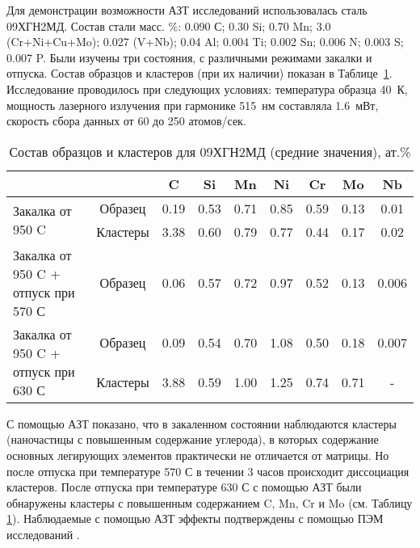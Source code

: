 Для демонстрации возможности АЗТ исследований использовалась сталь 09ХГН2МД. Состав стали масс. \%: 0.090 С; 0.30 Si; 0.70 Mn; 3.0 (Cr+Ni+Cu+Mo); 0.027 (V+Nb); 0.04 Al; 0.004 Ti; 0.002 Sn; 0.006 N; 0.003 S; 0.007 P. Были изучены три состояния, с различными режимами закалки и отпуска. Состав образцов и кластеров (при их наличии) показан в Таблице~\cref{tab:SteelComposition09X}. Исследование проводилось при следующих условиях: температура образца 40~К, мощность лазерного излучения при гармонике 515~нм составляла 1.6~мВт, скорость сбора данных от 60 до 250 атомов/сек.


\begin{table} [htbp]
	\centering
	\caption{Состав образцов и кластеров для 09ХГН2МД (средние значения), ат.\%}
	\label{tab:SteelComposition09X}%
	\begin{SingleSpace}
		\begin{tabular}{| p{4.5cm} | c | c | c | c | c | c | c | c |}
			\hline
			 & & C & Si & Mn & Ni & Cr & Mo & Nb     \\ \hline
			\multirow{2}{*}{Закалка от 950 \textdegree C} & Образец & 0.19 & 0.53 & 0.71 & 0.85 & 0.59 & 0.13 & 0.01    \\ \cline{2-9}
			& Кластеры & 3.38 & 0.60 & 0.79 & 0.77 & 0.44 & 0.17 & 0.02    \\  \hline		
			Закалка от 950 \textdegree C + отпуск при 570 \textdegree С & Образец & 0.06 & 0.57 & 0.72 & 0.97 & 0.52 & 0.13 & 0.006    \\ \hline
			\multirow{2}{45mm}{Закалка от 950 \textdegree C + отпуск при 630 \textdegree С} & Образец & 0.09 & 0.54 & 0.70 & 1.08 & 0.50 & 0.18 & 0.007    \\ \cline{2-9}
			& Кластеры & 3.88 & 0.59 & 1.00 & 1.25 & 0.74 & 0.71 & -    \\  \hline	
		\end{tabular}%
	\end{SingleSpace}
\end{table}

\FloatBarrier
С помощью АЗТ показано, что в закаленном состоянии наблюдаются кластеры (наночастицы с повышенным содержание углерода), в которых содержание основных легирующих элементов практически не отличается от матрицы. Но после отпуска при температуре 570 \textdegree С в течении 3 часов происходит диссоциация кластеров. После отпуска при температуре 630 \textdegree С с помощью АЗТ были обнаружены кластеры с повышенным содержанием C, Mn, Cr и Mo (см. Таблицу \cref{tab:SteelComposition09X}). Наблюдаемые с помощью АЗТ эффекты подтверждены с помощью ПЭМ исследований \cite{scbibGlubev}.

